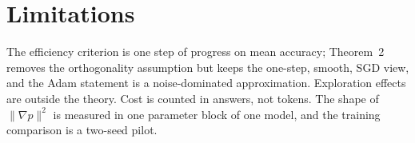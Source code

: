 \documentclass[11pt]{article}
\begin{document}
\section{Limitations}
The efficiency criterion is one step of progress on mean accuracy; Theorem~2 removes the orthogonality assumption but keeps the one-step, smooth, SGD view, and the Adam statement is a noise-dominated approximation. Exploration effects are outside the theory. Cost is counted in answers, not tokens. The shape of $\|\nabla p\|^2$ is measured in one parameter block of one model, and the training comparison is a two-seed pilot.



\end{document}
